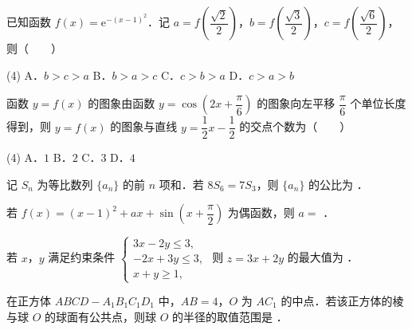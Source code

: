 \begin{question}
已知函数 $f(x)=\mathrm e^{-(x-1)^2}$．记 $a=f\left(\dfrac{\sqrt2}{2}\right)$，$b=f\left(\dfrac{\sqrt3}{2}\right)$，$c=f\left(\dfrac{\sqrt6}{2}\right)$，则\mbox{（　　）}

\begin{gkopts}(4)
\task A．$b>c>a$
\task B．$b>a>c$
\task C．$c>b>a$
\task D．$c>a>b$
\end{gkopts}

\end{question}
\begin{question}
函数 $y=f(x)$ 的图象由函数 $y=\cos\left(2x+\dfrac\pi6\right)$ 的图象向左平移 $\dfrac\pi6$ 个单位长度得到，则 $y=f(x)$ 的图象与直线 $y=\dfrac12x-\dfrac12$ 的交点个数为\mbox{（　　）}

\begin{gkopts}(4)
\task A．$1$
\task B．$2$
\task C．$3$
\task D．$4$
\end{gkopts}

\par\medskip

\end{question}

\begin{question}
记 $S_n$ 为等比数列 $\{a_n\}$ 的前 $n$ 项和．若 $8S_6=7S_3$，则 $\{a_n\}$ 的公比为 \gkblank{}．

\end{question}
\begin{question}
若 $f(x)=(x-1)^2+ax+\sin\left(x+\dfrac\pi2\right)$ 为偶函数，则 $a=$ \gkblank{}．

\end{question}
\begin{question}
若 $x$，$y$ 满足约束条件 $\begin{cases}3x-2y\leqslant3,\\-2x+3y\leqslant3,\\x+y\geqslant1,\end{cases}$ 则 $z=3x+2y$ 的最大值为 \gkblank{}．

\end{question}
\begin{question}
在正方体 $ABCD-A_1B_1C_1D_1$ 中，$AB=4$，$O$ 为 $AC_1$ 的中点．若该正方体的棱与球 $O$ 的球面有公共点，则球 $O$ 的半径的取值范围是 \gkblank{}．

\par\medskip

\end{question}

